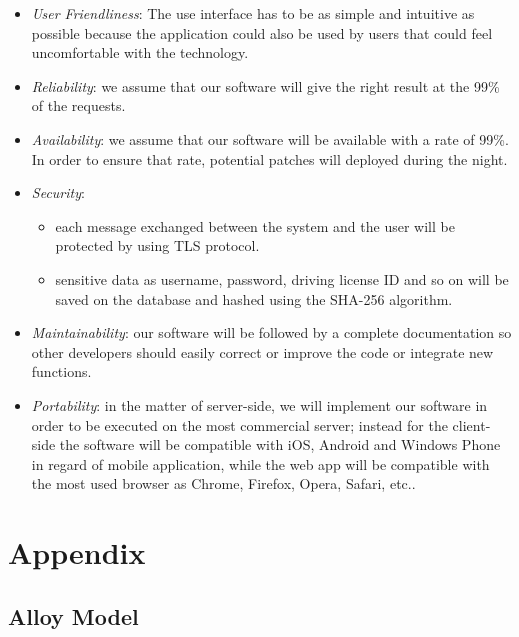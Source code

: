 \documentclass[english]{article}
\begin{document}
\begin{itemize}

  \item{\textit{User Friendliness}:
    The use interface has to be as simple and intuitive as possible because
    the application could also be used by users that could feel uncomfortable with the technology.}

  \item{\textit{Reliability}: we assume that our software will give the right result at the 99\% of the requests.}

  \item{\textit{Availability}: we assume that our software will be available with a rate of 99\%.
                               In order to ensure that rate, potential patches will deployed during the night.}

  \item{\textit{Security}:
    \begin{itemize}
      \item{each message exchanged between the system and the user will be protected by using TLS protocol.}
      \item{sensitive data as username, password, driving license ID and so on will be saved on the database and hashed using the SHA-256 algorithm.}
\end{itemize}}
  \item{\textit{Maintainability}: our software will be followed by a complete documentation so other developers should easily correct or improve the code
                                  or integrate new functions.}

  \item{\textit{Portability}: in the matter of server-side, we will implement our software in order to be executed on the most commercial server;
                              instead for the client-side the software will be compatible with iOS, Android and Windows Phone in regard of mobile application,
                              while the web app will be compatible with the most used browser as Chrome, Firefox, Opera, Safari, etc..}

\end{itemize}

\newpage{}

\section{Appendix}

\subsection{Alloy Model}
\end{document}

